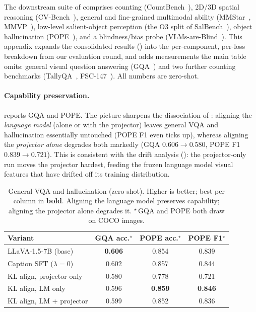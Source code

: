 The downstream suite of  comprises counting (CountBench~\citep{paiss2023teaching}), 2D/3D spatial reasoning (CV-Bench~\citep{tong2024cambrian}), general and fine-grained multimodal ability (MMStar~\citep{chen2024mmstar}, MMVP~\citep{tong2024mmvp}), low-level salient-object perception (the O3 split of SalBench~\citep{dahou2025salbench}), object hallucination (POPE~\citep{li2023pope}), and a blindness/bias probe (VLMs-are-Blind~\citep{rahmanzadehgervi2024blind}). This appendix expands the consolidated results () into the per-component, per-loss breakdown from our evaluation round, and adds measurements the main table omits: general visual question answering (GQA~\citep{hudson2019gqa}) and two further counting benchmarks (TallyQA~\citep{acharya2019tallyqa}, FSC-147~\citep{ranjan2021counting}). All numbers are zero-shot.

\paragraph{Capability preservation.}
 reports GQA and POPE. The picture sharpens the dissociation of : aligning the \emph{language model} (alone or with the projector) leaves general VQA and hallucination essentially untouched (POPE F1 even ticks up), whereas aligning the \emph{projector alone} degrades both markedly (GQA $0.606\!\to\!0.580$, POPE F1 $0.839\!\to\!0.721$). This is consistent with the drift analysis (): the projector-only run moves the projector hardest, feeding the frozen language model visual features that have drifted off its training distribution.

\begin{table}[h]
\centering
\caption{General VQA and hallucination (zero-shot). Higher is better; best per column in \textbf{bold}. Aligning the language model preserves capability; aligning the projector alone degrades it. $^{\star}$\,GQA and POPE both draw on COCO images.}
\label{tab:gqa_pope}
\vskip 0.1in
\small
\begin{tabular}{lccc}
\toprule
Variant & GQA acc.$^{\star}$ & POPE acc.$^{\star}$ & POPE F1$^{\star}$ \\
\midrule
LLaVA-1.5-7B (base)        & \textbf{0.606} & 0.854 & 0.839 \\
Caption SFT ($\lambda{=}0$) & 0.602 & 0.857 & 0.844 \\
KL align, projector only   & 0.580 & 0.778 & 0.721 \\
KL align, LM only          & 0.596 & \textbf{0.859} & \textbf{0.846} \\
KL align, LM + projector   & 0.599 & 0.852 & 0.836 \\
\bottomrule
\end{tabular}
\end{table}

